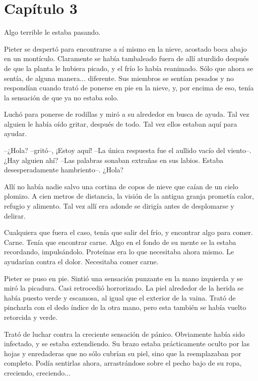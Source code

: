 \chapter*{Capítulo 3}

Algo terrible le estaba pasando.



Pieter se despertó para encontrarse a sí mismo en la nieve, acostado boca abajo en un montículo. Claramente se había tambaleado fuera de allí aturdido después de que la planta le hubiera picado, y el frío lo había reanimado. Sólo que ahora se sentía, de alguna manera... diferente. Sus miembros se sentían pesados y no respondían cuando trató de ponerse en pie en la nieve, y, por encima de eso, tenía la sensación de que ya no estaba solo.



Luchó para ponerse de rodillas y miró a su alrededor en busca de ayuda. Tal vez alguien le había oído gritar, después de todo. Tal vez ellos estaban aquí para ayudar.



--¿Hola? --gritó--, ¡Estoy aquí! --La única respuesta fue el aullido vacío del viento--. ¿Hay alguien ahí? --Las palabras sonaban extrañas en sus labios. Estaba desesperadamente hambriento--. ¿Hola?



Allí no había nadie salvo una cortina de copos de nieve que caían de un cielo plomizo. A cien metros de distancia, la visión de la antigua granja prometía calor, refugio y alimento. Tal vez allí era adonde se dirigía antes de desplomarse y delirar.



Cualquiera que fuera el caso, tenía que salir del frío, y encontrar algo para comer. Carne. Tenía que encontrar carne. Algo en el fondo de su mente se la estaba recordando, impulsándolo. Proteínas era lo que necesitaba ahora mismo. Le ayudarían contra el dolor. Necesitaba comer carne.



Pieter se puso en pie. Sintió una sensación punzante en la mano izquierda y se miró la picadura. Casi retrocedió horrorizado. La piel alrededor de la herida se había puesto verde y escamosa, al igual que el exterior de la vaina. Trató de pincharla con el dedo índice de la otra mano, pero esta también se había vuelto retorcida y verde.



Trató de luchar contra la creciente sensación de pánico. Obviamente había sido infectado, y se estaba extendiendo. Su brazo estaba prácticamente oculto por las hojas y enredaderas que no sólo cubrían su piel, sino que la reemplazaban por completo. Podía sentirlas ahora, arrastrándose sobre el pecho bajo de su ropa, creciendo, creciendo...



